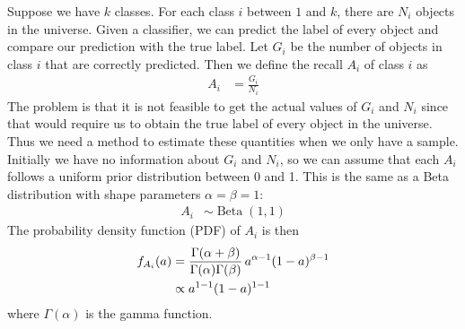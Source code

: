 \documentclass[fleqn,10pt,lineno]{wlpeerj} %
\DeclareMathOperator{\Beta}{Beta}
\begin{document}
Suppose we have $k$ classes. For each class $i$ between $1$ and $k$, there are
$N_i$ objects in the universe. Given a classifier, we can predict the label of
every object and compare our prediction with the true label. Let $G_i$ be the
number of objects in class $i$ that are correctly predicted.
Then we define the recall $A_i$ of class $i$ as
	\begin{align}
		A_i &= \frac{G_i}{N_i}
	\end{align}
The problem is that it is not feasible to get the actual values of $G_i$ and
$N_i$ since that would require us to obtain the true label of every object in
the universe. Thus we need a method to estimate these quantities when we only
have a sample. Initially we have no information about $G_i$ and $N_i$, so we
can assume that each $A_i$ follows a uniform prior distribution between 0 and
1. This is the same as a Beta distribution with shape parameters $\alpha =
\beta = 1$:
	\begin{align}
		A_i &\sim \Beta(1,1)
	\end{align}
The probability density function (PDF) of $A_i$ is then
    \begin{align}
        f_{A_i}(a) &= \frac{\Gamma(\alpha+\beta)}{\Gamma(\alpha)\Gamma(\beta)}\,
        a^{\alpha-1}(1-a)^{\beta-1} \label{eqn:prior} \\
        &\propto   a^{1-1}(1-a)^{1-1}  \notag
    \end{align}
where $\Gamma(\alpha)$ is the gamma function.
\end{document}
